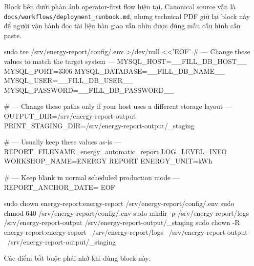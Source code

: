 Block bên dưới phản ánh operator-first flow hiện tại. Canonical source vẫn là \texttt{docs/workflows/deployment\_runbook.md}, nhưng technical PDF giữ lại block này để người vận hành đọc tài liệu bàn giao vẫn nhìn được đúng mẫu cấu hình cần paste.

\begin{ShellBlock}
sudo tee /srv/energy-report/config/.env >/dev/null <<'EOF'
# --- Change these values to match the target system ---
MYSQL_HOST=__FILL_DB_HOST__
MYSQL_PORT=3306
MYSQL_DATABASE=__FILL_DB_NAME__
MYSQL_USER=__FILL_DB_USER__
MYSQL_PASSWORD=__FILL_DB_PASSWORD__

# --- Change these paths only if your host uses a different storage layout ---
OUTPUT_DIR=/srv/energy-report-output
PRINT_STAGING_DIR=/srv/energy-report-output/_staging

# --- Usually keep these values as-is ---
REPORT_FILENAME=energy_automatic_report
LOG_LEVEL=INFO
WORKSHOP_NAME=ENERGY REPORT
ENERGY_UNIT=kWh

# --- Keep blank in normal scheduled production mode ---
REPORT_ANCHOR_DATE=
EOF

sudo chown energy-report:energy-report /srv/energy-report/config/.env
sudo chmod 640 /srv/energy-report/config/.env
sudo mkdir -p /srv/energy-report/logs /srv/energy-report-output /srv/energy-report-output/_staging
sudo chown -R energy-report:energy-report \
  /srv/energy-report/logs \
  /srv/energy-report-output \
  /srv/energy-report-output/_staging
\end{ShellBlock}

Các điểm bắt buộc phải nhớ khi dùng block này:

